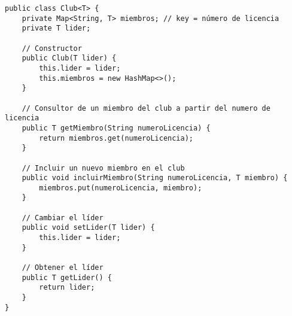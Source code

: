\documentclass[a4paper,12pt]{article}
\begin{document}
\begin{lstlisting}[style=customjava, caption={Código en java}]
    public class Club<T> {
    private Map<String, T> miembros; // key = número de licencia
    private T lider;

    // Constructor
    public Club(T lider) {
        this.lider = lider;
        this.miembros = new HashMap<>();
    }

    // Consultor de un miembro del club a partir del numero de licencia
    public T getMiembro(String numeroLicencia) {
        return miembros.get(numeroLicencia);
    }

    // Incluir un nuevo miembro en el club
    public void incluirMiembro(String numeroLicencia, T miembro) {
        miembros.put(numeroLicencia, miembro);
    }

    // Cambiar el líder
    public void setLider(T lider) {
        this.lider = lider;
    }

    // Obtener el líder
    public T getLider() {
        return lider;
    }
}
\end{lstlisting}
\end{document}
